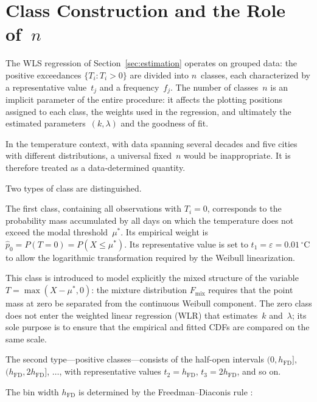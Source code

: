 \documentclass[APA,STIX1COL]{WileyNJD-v2}
\begin{document}
\section{Class Construction and the Role of~$n$}
\label{sec:classes}

The WLS regression of Section~\ref{sec:estimation} operates on
grouped data: the positive exceedances $\{T_i:T_i>0\}$ are
divided into $n$~classes, each characterized by a representative
value~$t_j$ and a frequency~$f_j$. The number of classes~$n$ is
an implicit parameter of the entire procedure: it affects the
plotting positions assigned to each class, the weights used in
the regression, and ultimately the estimated parameters~$(k,\lambda)$
and the goodness of fit.

In the temperature context, with data spanning several decades
and five cities with different distributions, a universal
fixed~$n$ would be inappropriate. It is therefore treated as a
data-determined quantity.

Two types of class are distinguished.

The first class, containing all observations with $T_i=0$,
corresponds to the probability mass accumulated by all days on
which the temperature does not exceed the modal threshold~$\mu^*$.
Its empirical weight is $\hat{p}_0=P(T=0)=P(X\leq\mu^*)$. Its
representative value is set to
$t_1=\varepsilon=0.01\,{}^\circ\mathrm{C}$ to allow the
logarithmic transformation required by the Weibull linearization.

This class is introduced to model explicitly the mixed structure
of the variable $T=\max(X-\mu^*,0)$: the mixture distribution
$F_{\text{mix}}$ requires that the point mass at zero be separated
from the continuous Weibull component. The zero class does not
enter the weighted linear regression (WLR) that estimates~$k$
and~$\lambda$; its sole purpose is to ensure that the empirical
and fitted CDFs are compared on the same scale.

\medskip

The second type---positive classes---consists of the half-open
intervals $(0,h_{\mathrm{FD}}]$,
$(h_{\mathrm{FD}},2h_{\mathrm{FD}}]$, $\ldots$, with
representative values $t_2=h_{\mathrm{FD}}$,
$t_3=2h_{\mathrm{FD}}$, and so on.

\medskip

The bin width $h_{\mathrm{FD}}$ is determined by the
Freedman--Diaconis rule \citep{freedman1981}:
\end{document}
